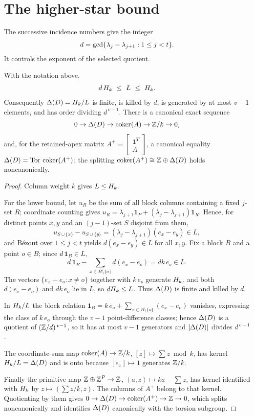 \section{The higher-star bound}\label{sec:stars}

The successive incidence numbers give the integer
\[
d=\gcd\{\lambda_j-\lambda_{j+1}:1\le j<t\}.
\]
It controls the exponent of the selected quotient.

\begin{theorem}\label{thm:hs}
With the notation above,
\[
d\,H_k\ \le\ L\ \le\ H_k .
\]
Consequently $\Delta(D)=H_k/L$ is finite, is killed by $d$, is generated by at
most $v-1$ elements, and has order dividing $d^{\,v-1}$. There is a canonical
exact sequence
\[
0\to\Delta(D)\to\operatorname{coker}(A)\to\mathbb{Z}/k\to0,
\]
and, for the retained-apex matrix $A^{+}=\left[\begin{smallmatrix}\mathbf
1^{T}\\ A\end{smallmatrix}\right]$, a canonical equality
$\Delta(D)=\mathrm{Tor}\,\operatorname{coker}(A^{+})$; the splitting
$\operatorname{coker}(A^{+})\cong\mathbb{Z}\oplus\Delta(D)$ holds noncanonically.
\end{theorem}

\begin{proof}
Column weight $k$ gives $L\le H_k$.

For the lower bound, let $u_R$ be the sum of
all block columns containing a fixed $j$-set $R$; coordinate counting gives
$u_R=\lambda_{j+1}\mathbf 1_P+(\lambda_j-\lambda_{j+1})\mathbf 1_R$. Hence, for
distinct points $x,y$ and an $(j-1)$-set $S$ disjoint from them,
\[
u_{S\cup\{x\}}-u_{S\cup\{y\}}=(\lambda_j-\lambda_{j+1})(e_x-e_y)\in L ,
\]
and B\'ezout over $1\le j<t$ yields $d(e_x-e_y)\in L$ for all $x,y$. Fix a block
$B$ and a point $o\in B$; since $d\,\mathbf 1_B\in L$,
\[
d\,\mathbf 1_B-\sum_{x\in B\setminus\{o\}}d(e_x-e_o)=dk\,e_o\in L .
\]
The vectors $\{e_x-e_o:x\ne o\}$ together with $k\,e_o$ generate $H_k$, and both
$d(e_x-e_o)$ and $dk\,e_o$ lie in $L$, so $dH_k\le L$. Thus $\Delta(D)$ is finite
and killed by $d$.

In $H_k/L$ the block relation
$\mathbf 1_B=k\,e_o+\sum_{x\in B\setminus\{o\}}(e_x-e_o)$ vanishes, expressing the
class of $k\,e_o$ through the $v-1$ point-difference classes; hence $\Delta(D)$ is
a quotient of $(\mathbb{Z}/d)^{\,v-1}$, so it has at most $v-1$ generators and
$|\Delta(D)|$ divides $d^{\,v-1}$.

The coordinate-sum map
$\operatorname{coker}(A)\to\mathbb{Z}/k$, $[z]\mapsto\sum z\bmod k$, has kernel $H_k/L=\Delta(D)$ and is
onto because $[e_x]\mapsto1$ generates $\mathbb{Z}/k$.

Finally the primitive map
$\mathbb{Z}\oplus\mathbb{Z}^P\to\mathbb{Z}$, $(a,z)\mapsto ka-\sum z$, has kernel identified
with $H_k$ by $z\mapsto(\sum z/k,z)$. The columns of $A^+$ belong to that
kernel. Quotienting by them gives
$0\to\Delta(D)\to\operatorname{coker}(A^+)\to\mathbb{Z}\to0$, which splits noncanonically
and identifies $\Delta(D)$ canonically with the torsion subgroup.
\end{proof}

